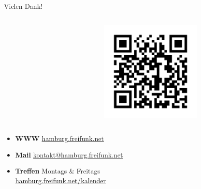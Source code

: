 \documentclass[t]{beamer}
\begin{document}
  \begin{frame}{Vielen Dank!}
    \begin{columns}
      \begin{column}{0.5\textwidth}
        \centering
        
      \end{column}
      
      \begin{column}{0.5\textwidth}
        \centering
        \includegraphics[width=0.65\textwidth]{Bilder/qrcode-2018-11-23}
      \end{column}
    \end{columns}   
    
    \begin{itemize}
      \item \textbf{WWW} \href{https://hamburg.freifunk.net}{hamburg.freifunk.net}
      \item \textbf{Mail} \href{mailto:kontakt@hamburg.freifunk.net}{kontakt@hamburg.freifunk.net}
      \item \textbf{Treffen} Montags \& Freitags\\\href{https://hamburg.freifunk.net/kalender}{\small hamburg.freifunk.net/kalender}
    \end{itemize}
  \end{frame}
  
\end{document}
